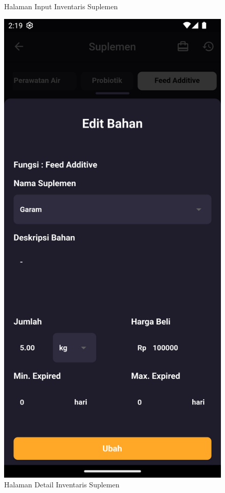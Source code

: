 \begin{spacing}{1.5}
\begin{enumerate}
\begin{enumerate}
\begin{itemize}
\begin{figure}[H]
						\caption{Halaman Input Inventaris Suplemen}
					\endminipage\hfill
						\includegraphics[width=\linewidth]{gambar/sprint4/sup_3.png}
						\caption{Halaman Detail Inventaris Suplemen}
					\endminipage\hfill
				\end{figure}


\end{itemize}
\end{enumerate}
\end{enumerate}
\end{spacing}
